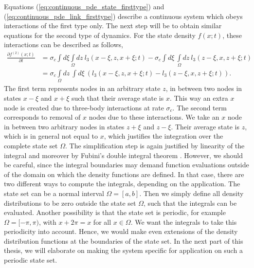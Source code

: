 Equations (\ref{eq:continuous_pde_state_firsttype}) and (\ref{eq:continuous_pde_link_firsttype}) describe a continuous system which obeys interactions of the first type only. The next step will be to obtain similar equations for the second type of dynamics. For the state density $f(x;t)$, these interactions can be described as follows,
\begin{equation}
\begin{aligned}
\frac{\partial f^{(2)}(x;t)}{\partial t} 
&= \sigma_c \int d \xi  \int\limits_{\Omega}dz\ l_3(x-\xi ,z,x+\xi ;t)   - \sigma_c \int d\xi \ \int\limits_{\Omega} dz\ l_3(z-\xi,x,z+\xi;t) \\
&= \sigma_c \int\limits_{\Omega}dz\ \int d \xi\ \left( l_3(x-\xi ,z,x+\xi ;t)   - l_3(z-\xi,x,z+\xi;t) \right)
.
\label{eq:continuous_pde_state_secondtype}
\end{aligned}
\end{equation}
The first term represents nodes in an arbitrary state $z$, in between two nodes in states $x-\xi $ and $x+\xi $ such that their average state is $x$. This way an extra $x$ node is created due to three-body interactions at rate $\sigma_c$. The second term corresponds to removal of $x$ nodes due to these interactions. We take an $x$ node in between two arbitrary nodes in states $z+\xi$ and $z-\xi$. Their average state is $z$, which is in general not equal to $x$, which justifies the integration over the complete state set $\Omega$. The simplification step is again justified by linearity of the integral and moreover by Fubini's double integral theorem \cite{Fubini1907}.
However, we should be careful, since the integral boundaries may demand function evaluations outside of the domain on which the density functions are defined. In that case, there are two different ways to compute the integrals, depending on the application. The state set can be a normal interval $\Omega =[a,b]$. Then we simply define all density distributions to be zero outside the state set $\Omega$, such that the integrals can be evaluated. Another possibility is that the state set is periodic, for example $\Omega =[-\pi,\pi)$, with $x+2\pi=x$ for all $x\in\Omega$. We want the integrals to take this periodicity into account. Hence, we would make even extensions of the density distribution functions at the boundaries of the state set. In the next part of this thesis, we will elaborate on making the system specific for application on such a periodic state set.

